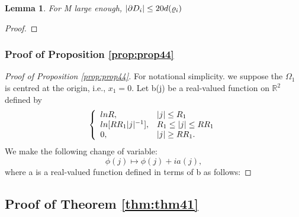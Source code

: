 \documentclass[11pt,reqno]{article}
\DeclarePairedDelimiter\abs{\lvert}{\rvert}%
\newtheorem{lemma}[thm]{Lemma}
\theoremstyle{definition}
\newcommand{\threepartdef}[6]
{
	\left\{
		\begin{array}{lll}
			#1 & #2 \\
			#3 & #4 \\
			#5 & #6
		\end{array}
	\right.
}
\begin{document}
\begin{lemma}
For M large enough, $\abs{\partial D_i} \leq 20 d(\varrho_i)$
\end{lemma}

\begin{proof}
\end{proof}

\subsubsection{Proof of Proposition \eqref{prop:prop44}}
\begin{proof}[Proof of Proposition \eqref{prop:prop44}]
For notational simplicity. we suppose the $\Omega_1$ is centred at the origin, i.e., $x_1=0$. Let b(j) be a real-valued function on $\mathbb{R}^2$ defined by
$$
\threepartdef{lnR,} {\abs{j} \leq R_1}
{ln[RR_1\abs{j}^{-1}],}{R_1 \leq \abs{j} \leq RR_1}
{0,}{\abs{j} \geq RR_1.}
$$
We make the following change of variable:
$$
\phi(j) \longmapsto \phi(j) + ia(j),
$$
where a is a real-valued function defined in terms of b as follows:

\end{proof}

\subsection{Proof of Theorem \eqref{thm:thm41}}
\end{document}
